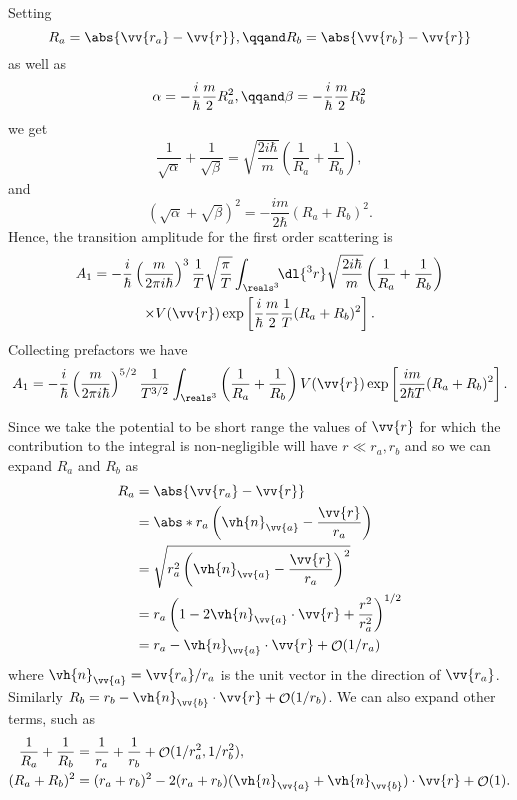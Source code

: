 \documentclass[fleqn]{NotesClass}
\newcommand*{\order}{\mathop{\mathcal{O}}}
\begin{document}
    Setting
    \begin{equation}
        R_a = \abs{\vv{r_a} - \vv{r}}, \qqand R_b = \abs{\vv{r_b} - \vv{r}}
    \end{equation}
    as well as
    \begin{equation}
        \alpha = -\frac{i}{\hbar} \frac{m}{2} R_a^2, \qqand \beta = -\frac{i}{\hbar} \frac{m}{2} R_b^2
    \end{equation}
    we get
    \begin{equation}
        \frac{1}{\sqrt{\alpha}} + \frac{1}{\sqrt{\beta}} = \sqrt{\frac{2i\hbar}{m}} \left( \frac{1}{R_a} + \frac{1}{R_b} \right),
    \end{equation}
    and
    \begin{equation}
        (\sqrt{\alpha} + \sqrt{\beta})^2 = -\frac{im}{2\hbar}(R_a + R_b)^2.
    \end{equation}
    Hence, the transition amplitude for the first order scattering is
    \begin{multline}
        A_1 = -\frac{i}{\hbar} \left( \frac{m}{2\pi i\hbar} \right)^{3} \frac{1}{T}\sqrt{\frac{\pi}{T}} \int_{\reals^3} \!\! \dl{^3r} \sqrt{\frac{2i\hbar}{m}} \left( \frac{1}{R_a} + \frac{1}{R_b} \right)\\
        \times V(\vv{r}) \exp\left[ \frac{i}{\hbar} \frac{m}{2} \frac{1}{T} (R_a + R_b)^2 \right].
    \end{multline}
    Collecting prefactors we have
    \begin{equation}
        A_1 = -\frac{i}{\hbar} \left( \frac{m}{2\pi i\hbar} \right)^{5/2} \frac{1}{T^{3/2}} \int_{\reals^3} \left( \frac{1}{R_a} + \frac{1}{R_b} \right) V(\vv{r}) \exp\left[ \frac{im}{2\hbar T}(R_a + R_b)^2 \right].
    \end{equation}
    
    Since we take the potential to be short range the values of \(\vv{r}\) for which the contribution to the integral is non-negligible will have \(r \ll r_a, r_b\) and so we can expand \(R_a\) and \(R_b\) as
    \begin{align}
        R_a &= \abs{\vv{r_a} - \vv{r}}\\
        &= \abs*{r_a\left(\vh{n}_{\vv{a}} - \frac{\vv{r}}{r_a}\right)}\\
        &= \sqrt{r_a^2\left(\vh{n}_{\vv{a}} - \frac{\vv{r}}{r_a}\right)^2}\\
        &= r_a\left( 1 - 2\vh{n}_{\vv{a}} \cdot \vv{r} + \frac{r^2}{r_a^2} \right)^{1/2}\\
        &= r_a - \vh{n}_{\vv{a}} \cdot \vv{r} + \order(1/r_a)
    \end{align}
    where \(\vh{n}_{\vv{a}} = \vv{r_a}/r_a\) is the unit vector in the direction of \(\vv{r_a}\).
    Similarly \(R_b = r_b - \vh{n}_{\vv{b}} \cdot \vv{r} + \order(1/r_b)\).
    We can also expand other terms, such as
    \begin{align}
        \frac{1}{R_a} + \frac{1}{R_b} &= \frac{1}{r_a} + \frac{1}{r_b} + \order(1/r_a^2, 1/r_b^2),\\
        (R_a + R_b)^2 &= (r_a + r_b)^2 - 2(r_a + r_b)(\vh{n}_{\vv{a}} + \vh{n}_{\vv{b}}) \cdot \vv{r} + \order(1).
    \end{align}
    
\end{document}
